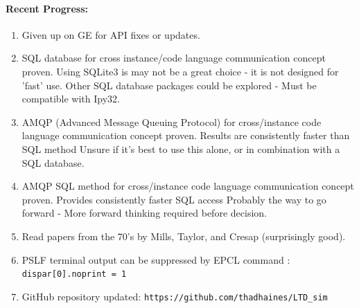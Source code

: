\documentclass[12pt]{article}
\begin{document}
	\paragraph{Recent Progress:}
	\begin{enumerate}
		\item Given up on GE for API fixes or updates.
		
		\item SQL database for cross instance/code language communication concept proven.
		\subitem Using SQLite3 is may not be a great choice - it is not designed for 'fast' use.
		\subitem Other SQL database packages could be explored - Must be compatible with Ipy32.
		
		\item AMQP (Advanced Message Queuing Protocol) for cross/instance code language communication concept proven.
		\subitem Results are consistently faster than SQL method
		\subitem Unsure if it's best to use this alone, or in combination with a SQL database.
		
		\item AMQP SQL method for cross/instance code language communication concept proven.
		\subitem Provides consistently faster SQL access
		\subitem Probably the way to go forward - More forward thinking required before decision.
		
		\item Read papers from the 70's by Mills, Taylor, and Cresap (surprisingly good).
		
		\item PSLF terminal output can be suppressed by EPCL command : \verb|dispar[0].noprint = 1|
		
		\item GitHub repository updated:
		\subitem \verb|https://github.com/thadhaines/LTD_sim|
		
	\end{enumerate}
\end{document}

